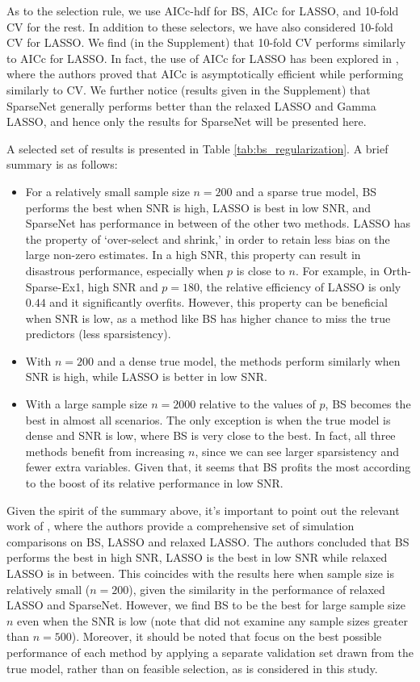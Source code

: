 As to the selection rule, we use AICc-hdf for BS, AICc for LASSO, and 10-fold CV for the rest. In addition to these selectors, we have also considered 10-fold CV for LASSO. We find (in the Supplement) that 10-fold CV performs similarly to AICc for LASSO. In fact, the use of AICc for LASSO has been explored in \citet{Flynn2013}, where the authors proved that AICc is asymptotically efficient while performing similarly to CV. We further notice (results given in the Supplement) that SparseNet generally performs better than the relaxed LASSO and Gamma LASSO, and hence only the results for SparseNet will be presented here. 

A selected set of results is presented in Table \ref{tab:bs_regularization}. A brief summary is as follows:
\begin{itemize}
	\item For a relatively small sample size $n=200$ and a sparse true model, BS performs the best when SNR is high,  LASSO is best in low SNR, and SparseNet has performance in between of the other two methods. LASSO has the property of `over-select and shrink,' in order to retain less bias on the large non-zero estimates. In a high SNR, this property can result in disastrous performance, especially when $p$ is close to $n$. For example, in Orth-Sparse-Ex1, high SNR and $p=180$, the relative efficiency of LASSO is only $0.44$ and it significantly overfits. However, this property can be beneficial when SNR is low, as a method like BS has higher chance to miss the true predictors (less sparsistency).
	
	\item With $n=200$ and a dense true model, the methods perform similarly when SNR is high, while LASSO is better in low SNR.
	
	\item With a large sample size $n=2000$ relative to the values of $p$, BS becomes the best in almost all scenarios. The only exception is when the true model is dense and SNR is low, where BS is very close to the best. In fact, all three methods benefit from increasing $n$, since we can see larger sparsistency and fewer extra variables. Given that, it seems that BS profits the most according to the boost of its relative performance in low SNR. 
\end{itemize}

Given the spirit of the summary above, it's important to point out the relevant work of \citet{Hastie2017}, where the authors provide a comprehensive set of simulation comparisons on BS, LASSO and relaxed LASSO. The authors concluded that BS performs the best in high SNR, LASSO is the best in low SNR while relaxed LASSO is in between. This coincides with the results here when sample size is relatively small ($n=200$), given the similarity in the performance of relaxed LASSO and SparseNet. However, we find BS to be the best for large sample size $n$ even when the SNR is low (note that \citet{Hastie2017} did not examine any sample sizes greater than $n=500$). Moreover, it should be noted that \citet{Hastie2017} focus on the best possible performance of each method by applying a separate validation set drawn from the true model, rather than on feasible selection, as is considered in this study. 

